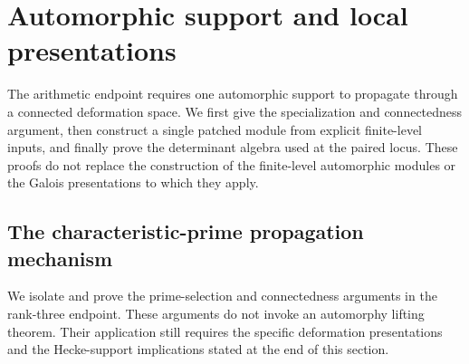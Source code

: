 \section{Automorphic support and local presentations}
\label{sec:sr-support-propagation}
The arithmetic endpoint requires one automorphic support to propagate
through a connected deformation space. We first give the specialization
and connectedness argument, then construct a single patched module
from explicit finite-level inputs, and finally prove the determinant
algebra used at the paired locus. These proofs do not replace the
construction of the finite-level automorphic modules or the Galois
presentations to which they apply.

\subsection{The characteristic-prime propagation mechanism}
\label{sec:sr-characteristic-propagation}
We isolate and prove the prime-selection and connectedness arguments in
the rank-three endpoint. These arguments do not invoke an automorphy
lifting theorem. Their application still requires the specific
deformation presentations and the Hecke-support implications stated
at the end of this section.

